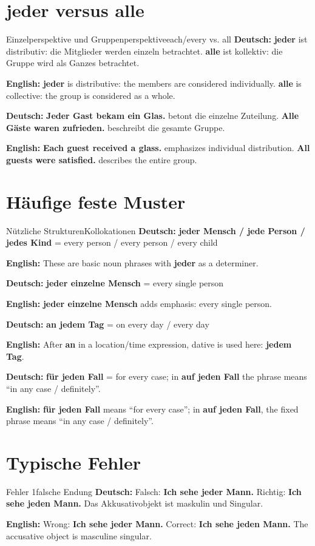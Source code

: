 \documentclass[a4paper,11pt]{article}
\newcommand{\GermanText}[1]{\textbf{Deutsch: }#1\par}
\newcommand{\EnglishText}[1]{{\small\color{SoftGray}\textbf{English: }#1\par}}
\begin{document}
\section{jeder versus alle}
\begin{grammarentry}{Einzelperspektive und Gruppenperspektive}{each/every vs. all}
\GermanText{\textbf{jeder} ist distributiv: die Mitglieder werden einzeln betrachtet. \textbf{alle} ist kollektiv: die Gruppe wird als Ganzes betrachtet.}
\EnglishText{\textbf{jeder} is distributive: the members are considered individually. \textbf{alle} is collective: the group is considered as a whole.}
\GermanText{\textbf{Jeder Gast bekam ein Glas.} betont die einzelne Zuteilung. \textbf{Alle Gäste waren zufrieden.} beschreibt die gesamte Gruppe.}
\EnglishText{\textbf{Each guest received a glass.} emphasizes individual distribution. \textbf{All guests were satisfied.} describes the entire group.}
\end{grammarentry}

\section{Häufige feste Muster}
\begin{grammarentry}{Nützliche Strukturen}{Kollokationen}
\GermanText{\textbf{jeder Mensch / jede Person / jedes Kind} = every person / every person / every child}
\EnglishText{These are basic noun phrases with \textbf{jeder} as a determiner.}
\GermanText{\textbf{jeder einzelne Mensch} = every single person}
\EnglishText{\textbf{jeder einzelne Mensch} adds emphasis: every single person.}
\GermanText{\textbf{an jedem Tag} = on every day / every day}
\EnglishText{After \textbf{an} in a location/time expression, dative is used here: \textbf{jedem Tag}.}
\GermanText{\textbf{für jeden Fall} = for every case; in \textbf{auf jeden Fall} the phrase means ``in any case / definitely''.}
\EnglishText{\textbf{für jeden Fall} means ``for every case''; in \textbf{auf jeden Fall}, the fixed phrase means ``in any case / definitely''.}
\end{grammarentry}

\section{Typische Fehler}
\begin{grammarentry}{Fehler 1}{falsche Endung}
\GermanText{Falsch: \textbf{Ich sehe jeder Mann.} Richtig: \textbf{Ich sehe jeden Mann.} Das Akkusativobjekt ist maskulin und Singular.}
\EnglishText{Wrong: \textbf{Ich sehe jeder Mann.} Correct: \textbf{Ich sehe jeden Mann.} The accusative object is masculine singular.}
\end{grammarentry}
\end{document}

